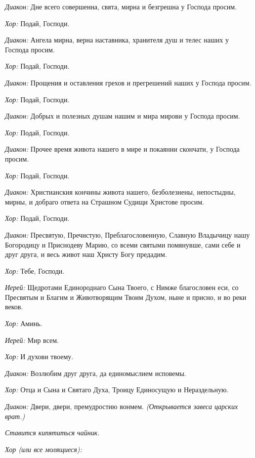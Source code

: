 \begin{mymulticols}
{\itshape Диакон:} Дне всего совершенна, свята, мирна и безгрешна у Господа просим. 

{\itshape Хор:} Подай, Господи. 

{\itshape Диакон:} Ангела мирна, верна наставника, хранителя душ и телес наших у Господа просим. 

{\itshape Хор:} Подай, Господи. 

{\itshape Диакон:} Прощения и оставления грехов и прегрешений наших у Господа просим. 

{\itshape Хор:} Подай, Господи. 

{\itshape Диакон:} Добрых и полезных душам нашим и мира мирови у Господа просим. 

{\itshape Хор:} Подай, Господи. 

{\itshape Диакон:} Прочее время живота нашего в мире и покаянии скончати, у Господа просим. 

{\itshape Хор:} Подай, Господи. 

{\itshape Диакон:} Христианския кончины живота нашего, безболезнены, непостыдны, мирны, и добраго ответа на Страшном Судищи Христове просим. 

{\itshape Хор:} Подай, Господи. 

{\itshape Диакон:} Пресвятую, Пречистую, Преблагословенную, Славную Владычицу нашу Богородицу и Приснодеву Марию, со всеми святыми помянувше, сами себе и друг друга, и весь живот наш Христу Богу предадим.

{\itshape Хор:} Тебе, Господи.

{\itshape Иерей:} Щедротами Единороднаго Сына Твоего, с Нимже благословен еси, со Пресвятым и Благим и Животворящим Твоим Духом, ныне и присно, и во реки веков.

{\itshape Хор:} Аминь.

{\itshape Иерей:} Мир всем.

{\itshape Хор:} И духови твоему.

{\itshape Диакон:} Возлюбим друг друга, да единомыслием исповемы.

{\itshape Хор:} Отца и Сына и Святаго Духа, Троицу Единосущую и Нераздельную.

{\itshape Диакон:} Двери, двери, премудростию вонмем. {\itshape (Открывается завеса царских врат.)}

{\itshape Ставится кипятиться чайник. }


{\itshape Хор (или все молящиеся):}


\end{mymulticols}
